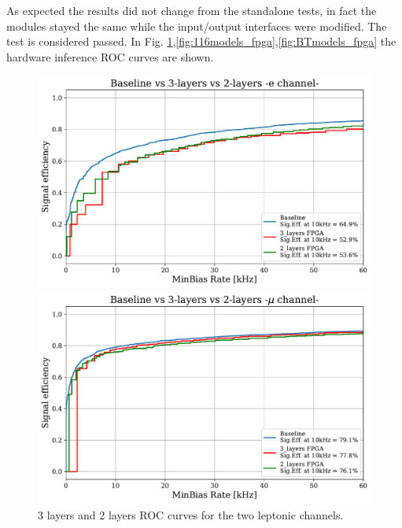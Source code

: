 \documentclass[../../main.tex]{subfiles}
\begin{document}
As expected the results did not change from the standalone tests, in fact the modules stayed the same while the input/output interfaces were modified. The test is considered passed.  
In Fig. \ref{fig:32models_fpga},\ref{fig:116models_fpga},\ref{fig:BTmodels_fpga} the hardware inference ROC curves are shown.

\begin{figure}[h] 
  \label{ fig7} 
  \begin{minipage}[b]{0.5\linewidth}
    \centering
    \includegraphics[width=.9\linewidth]{sections/05/Images/Results_32_1eleFPGA.pdf} 
    \vspace{4ex}
  \end{minipage}%
  \begin{minipage}[b]{0.5\linewidth}
    \centering
    \includegraphics[width=.9\linewidth]{sections/05/Images/Results_32_1muFPGA.pdf}
    \vspace{4ex}
  \end{minipage} 
  \caption{3 layers and 2 layers ROC curves for the two leptonic channels.}
  \label{fig:32models_fpga}
\end{figure}
\end{document}
